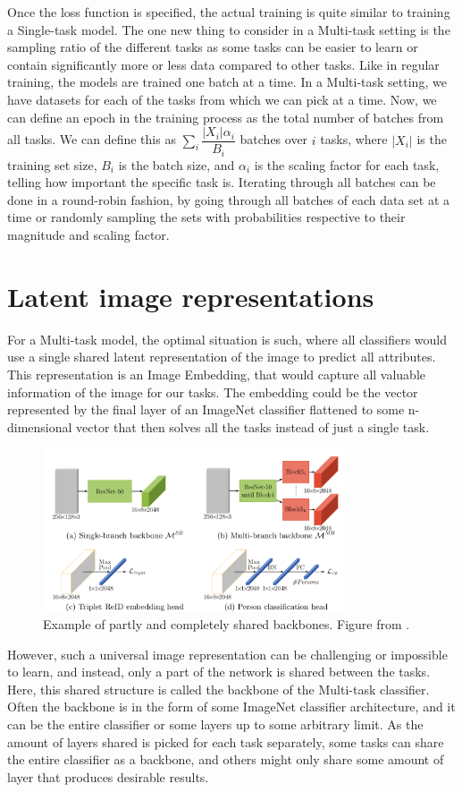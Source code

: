 Once the loss function is specified, the actual training is quite similar to training a Single-task model.
The one new thing to consider in a Multi-task setting is the sampling ratio of the different tasks as some tasks can be easier to learn or contain significantly more or less data compared to other tasks.
Like in regular training, the models are trained one batch at a time.
In a Multi-task setting, we have datasets for each of the tasks from which we can pick at a time.
Now, we can define an epoch in the training process as the total number of batches from all tasks.
We can define this as $\sum_i{ \dfrac{|X_i| \alpha_i}{B_i}}$ batches over $i$ tasks, where $|X_i|$ is the training set size, $B_i$ is the batch size, and $\alpha_i$ is the scaling factor for each task, telling how important the specific task is.
Iterating through all batches can be done in a round-robin fashion, by going through all batches of each data set at a time or randomly sampling the sets with probabilities respective to their magnitude and scaling factor.

\section{Latent image representations}
For a Multi-task model, the optimal situation is such, where all classifiers would use a single shared latent representation of the image to predict all attributes.
This representation is an Image Embedding, that would capture all valuable information of the image for our tasks.
The embedding could be the vector represented by the final layer of an ImageNet classifier flattened to some n-dimensional vector that then solves all the tasks instead of just a single task.
\begin{figure}[h!]
    \centering
    \includegraphics[width=0.8\textwidth]{imgs/sharedBackbone.png}
    \caption{Example of partly and completely shared backbones. Figure from \citep{visualPerson}.\label{fig:params}}
\end{figure}
However, such a universal image representation can be challenging or impossible to learn, and instead, only a part of the network is shared between the tasks.
Here, this shared structure is called the backbone of the Multi-task classifier.
Often the backbone is in the form of some ImageNet classifier architecture, and it can be the entire classifier or some layers up to some arbitrary limit.
As the amount of layers shared is picked for each task separately, some tasks can share the entire classifier as a backbone, and others might only share some amount of layer that produces desirable results.

